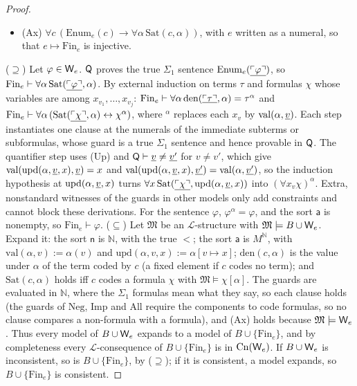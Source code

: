 \begin{proof}
\begin{itemize}[leftmargin=*]
\item (Ax) $\forall c\,(\mathrm{Enum}_e(c)\to\forall\alpha\,\mathrm{Sat}(c,\alpha))$, with $e$ written as a numeral, so that $e\mapsto\mathrm{Fin}_e$ is injective.
\end{itemize}
($\supseteq$) Let $\varphi\in\mathsf{W}_{e}$. $\mathsf{Q}$ proves the true $\Sigma_1$ sentence $\mathrm{Enum}_e(\underline{\ulcorner \varphi\urcorner})$, so $\mathrm{Fin}_e\vdash\forall\alpha\,\mathrm{Sat}(\underline{\ulcorner \varphi\urcorner},\alpha)$. By external induction on terms $\tau$ and formulas $\chi$ whose variables are among $x_{v_1},\dots,x_{v_j}$: $\mathrm{Fin}_e\vdash\forall\alpha\,\mathrm{den}(\underline{\ulcorner \tau\urcorner},\alpha)=\tau^\alpha$ and $\mathrm{Fin}_e\vdash\forall\alpha\,(\mathrm{Sat}(\underline{\ulcorner \chi\urcorner},\alpha)\leftrightarrow\chi^\alpha)$, where $^\alpha$ replaces each $x_v$ by $\mathrm{val}(\alpha,\underline{v})$. Each step instantiates one clause at the numerals of the immediate subterms or subformulas, whose guard is a true $\Sigma_1$ sentence and hence provable in $\mathsf{Q}$. The quantifier step uses (Up) and $\mathsf{Q}\vdash\underline{v}\ne\underline{v'}$ for $v\ne v'$, which give $\mathrm{val}(\mathrm{upd}(\alpha,\underline{v},x),\underline{v})=x$ and $\mathrm{val}(\mathrm{upd}(\alpha,\underline{v},x),\underline{v'})=\mathrm{val}(\alpha,\underline{v'})$, so the induction hypothesis at $\mathrm{upd}(\alpha,\underline{v},x)$ turns $\forall x\,\mathrm{Sat}(\underline{\ulcorner \chi\urcorner},\mathrm{upd}(\alpha,\underline{v},x))$ into $(\forall x_v\chi)^\alpha$. Extra, nonstandard witnesses of the guards in other models only add constraints and cannot block these derivations. For the sentence $\varphi$, $\varphi^\alpha=\varphi$, and the sort $\mathsf a$ is nonempty, so $\mathrm{Fin}_e\vdash\varphi$.
($\subseteq$) Let $\mathfrak M$ be an $\mathcal L$-structure with $\mathfrak M\models B\cup\mathsf{W}_{e}$. Expand it: the sort $\mathsf n$ is $\mathbb N$, with the true $<$; the sort $\mathsf a$ is $M^{\mathbb N}$, with $\mathrm{val}(\alpha,v):=\alpha(v)$ and $\mathrm{upd}(\alpha,v,x):=\alpha[v\mapsto x]$; $\mathrm{den}(c,\alpha)$ is the value under $\alpha$ of the term coded by $c$ (a fixed element if $c$ codes no term); and $\mathrm{Sat}(c,\alpha)$ holds iff $c$ codes a formula $\chi$ with $\mathfrak M\models\chi[\alpha]$. The guards are evaluated in $\mathbb N$, where the $\Sigma_1$ formulas mean what they say, so each clause holds (the guards of $\mathrm{Neg}$, $\mathrm{Imp}$ and $\mathrm{All}$ require the components to code formulas, so no clause compares a non-formula with a formula), and (Ax) holds because $\mathfrak M\models\mathsf{W}_{e}$. Thus every model of $B\cup\mathsf{W}_{e}$ expands to a model of $B\cup\{\mathrm{Fin}_e\}$, and by completeness every $\mathcal L$-consequence of $B\cup\{\mathrm{Fin}_e\}$ is in $\mathrm{Cn}(\mathsf{W}_{e})$. If $B\cup\mathsf{W}_{e}$ is inconsistent, so is $B\cup\{\mathrm{Fin}_e\}$, by ($\supseteq$); if it is consistent, a model expands, so $B\cup\{\mathrm{Fin}_e\}$ is consistent.

\end{proof}
